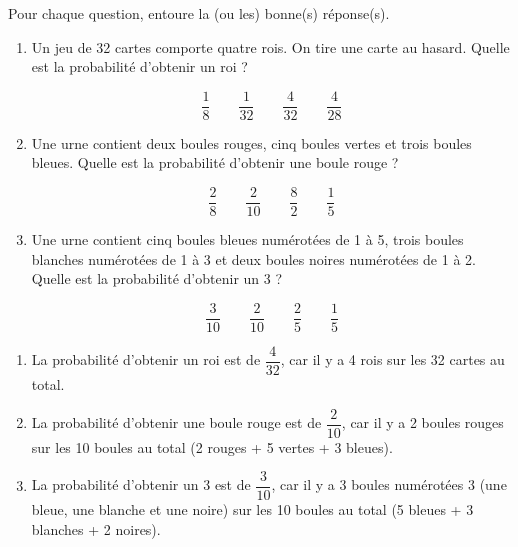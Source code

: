 \begin{exercice*}
    Pour chaque question, entoure la (ou les) bonne(s) réponse(s).

    \begin{enumerate}
        \item Un jeu de 32 cartes comporte quatre rois. On tire une carte au hasard. Quelle est la probabilité d'obtenir un roi ?

        \[\dfrac{1}{8} \qquad \dfrac{1}{32} \qquad \dfrac{4}{32} \qquad \dfrac{4}{28}\]

        \item Une urne contient deux boules rouges, cinq boules vertes et trois boules bleues. Quelle est la probabilité d'obtenir une boule rouge ?

                  \[\dfrac{2}{8} \qquad \dfrac{2}{10} \qquad \dfrac{8}{2} \qquad \dfrac{1}{5}\]

        \item Une urne contient cinq boules bleues numérotées de 1 à 5, trois boules blanches numérotées de 1 à 3 et deux boules noires numérotées de 1 à 2. Quelle est la probabilité d'obtenir un 3 ?

                  \[\dfrac{3}{10} \qquad \dfrac{2}{10} \qquad \dfrac{2}{5} \qquad \dfrac{1}{5}\]
    \end{enumerate}
\end{exercice*}
\begin{corrige}
    \begin{enumerate}
        \item La probabilité d'obtenir un roi est de $\dfrac{4}{32}$, car il y a 4 rois sur les 32 cartes au total.
        \item La probabilité d'obtenir une boule rouge est de $\dfrac{2}{10}$, car il y a 2 boules rouges sur les 10 boules au total (2 rouges + 5 vertes + 3 bleues).
        \item La probabilité d'obtenir un 3 est de $\dfrac{3}{10}$, car il y a 3 boules numérotées 3 (une bleue, une blanche et une noire) sur les 10 boules au total (5 bleues + 3 blanches + 2 noires).
    \end{enumerate}
\end{corrige}

